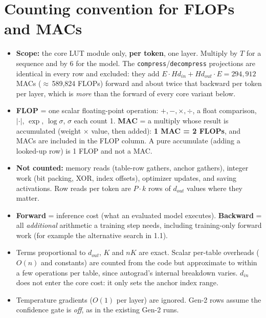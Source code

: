 \documentclass[10pt]{article}
\newcommand{\code}[1]{{\renewcommand{\_}{\textunderscore\allowbreak}\texttt{#1}}}
\begin{document}
\section*{Counting convention for FLOPs and MACs}
\begin{itemize}\setlength\itemsep{1pt}
\item \textbf{Scope:} the core LUT module only, \textbf{per token}, one layer. Multiply by $T$ for a sequence and by 6 for the
  model. The \code{compress}/\code{decompress} projections are identical in every row and excluded: they add
  $E\cdot Hd_{in}+Hd_{out}\cdot E=294{,}912$ MACs ($\approx$\,589,824 FLOPs) forward and about twice that backward per token per
  layer, which is \emph{more} than the forward of every core variant below.
\item \textbf{FLOP} = one scalar floating-point operation: $+,-,\times,\div$, a float comparison, $|\cdot|$, $\exp$, $\log\sigma$,
  $\sigma$ each count 1. \textbf{MAC} = a multiply whose result is accumulated (weight $\times$ value, then added):
  \textbf{1 MAC = 2 FLOPs}, and MACs are included in the FLOP column. A pure accumulate (adding a looked-up row) is 1 FLOP and not a MAC.
\item \textbf{Not counted:} memory reads (table-row gathers, anchor gathers), integer work (bit packing, XOR, index offsets),
  optimizer updates, and saving activations. Row reads per token are $P\cdot k$ rows of $d_{out}$ values where they matter.
\item \textbf{Forward} = inference cost (what an evaluated model executes). \textbf{Backward} = all \emph{additional}
  arithmetic a training step needs, including training-only forward work (for example the alternative search in 1.1).
\item Terms proportional to $d_{out}$, $K$ and $nK$ are exact. Scalar per-table overheads ($O(n)$ and constants) are
  counted from the code but approximate to within a few operations per table, since autograd's internal breakdown varies.
  $d_{in}$ does not enter the core cost: it only sets the anchor index range.
\item Temperature gradients ($O(1)$ per layer) are ignored. Gen-2 rows assume the confidence gate is \emph{off}, as in the existing Gen-2 runs.
\end{itemize}

\newpage
\end{document}
